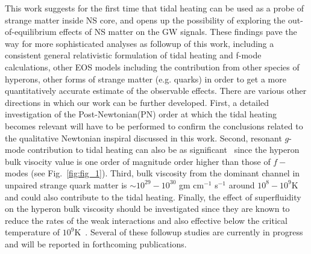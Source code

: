 \documentclass[%
 reprint,
 amsmath,amssymb,
 aps,
]{revtex4-2}
\begin{document}
This work suggests for the first time that tidal heating can be used as a probe of strange matter inside NS core, and opens up the possibility of exploring the out-of-equilibrium effects of NS matter on the GW signals. These findings pave the way for more sophisticated analyses as followup of this work, including a consistent general relativistic formulation of tidal heating and f-mode calculations, other EOS models including the contribution from other species of hyperons, other forms of strange matter (e.g. quarks) in order to get a more quantitatively accurate estimate of the observable effects. There are various other directions in which our work can be further developed. First, a detailed investigation of the Post-Newtonian(PN) order at which the tidal heating becomes relevant will have to be performed to confirm the conclusions related to the qualitative Newtonian inspiral discussed in this work. Second, resonant $g$-mode contribution to tidal heating can also be as significant~\cite{Lai_1994} since the hyperon bulk visocity value is one order of magnitude order higher than those of $f-$modes (see Fig.~\ref{fig:fig_1}). Third,  bulk viscosity from the dominant channel in unpaired strange quark matter is $\sim 10^{29}-10^{30}$ gm cm$^{-1}$ s$^{-1}$ around $10^8-10^9$K~\cite{Alford_2010,Alford_2014} and could also contribute to the tidal heating. Finally, the effect of superfluidity on the hyperon bulk viscosity should be investigated since they are known to reduce the rates of the weak interactions and also effective below the critical temperature of $10^9$K~\cite{Haskell2010}. Several of these followup studies are currently in progress and will be reported in forthcoming publications.\\
\end{document}
